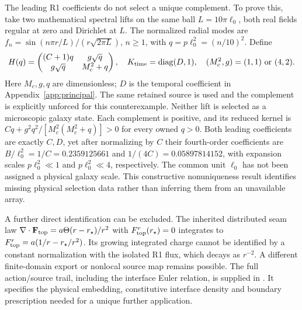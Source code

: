The leading R1 coefficients do not select a unique complement. To prove
this, take two mathematical spectral lifts on the same ball
$L=10\pi\ell_0$, both real fields regular at zero and Dirichlet at $L$.
The normalized radial modes are
$f_n=\sin(n\pi r/L)/(r\sqrt{2\pi L})$, $n\ge1$,
with $q=p\ell_0^2=(n/10)^2$. Define
\begin{equation}
 H(q)=\begin{pmatrix}(C+1)q&g\sqrt q\\g\sqrt q&M_c^2+q\end{pmatrix},
 \quad K_{\rm time}=\operatorname{diag}(D,1),
 \quad (M_c^2,g)=(1,1)\ \hbox{or}\ (4,2).
 \label{eq:complement-witness}
\end{equation}
Here $M_c,g,q$ are dimensionless; $D$ is the temporal coefficient in
Appendix~\ref{app:principal}. The same retained source is used and the
complement is explicitly unforced for this counterexample. Neither lift
is selected as a microscopic galaxy state. Each complement is positive,
and its reduced kernel is
$Cq+g^2q^2/[M_c^2(M_c^2+q)]>0$ for every owned $q>0$.
Both leading coefficients are exactly $C,D$, yet after normalizing by
$C$ their fourth-order coefficients are
$B/\ell_0^2=1/C=0.2359125661$ and
$1/(4C)=0.05897814152$, with expansion scales
$p\ell_0^2\ll1$ and $p\ell_0^2\ll4$, respectively.
The common unit $\ell_0$ has not been assigned a physical galaxy scale.
This constructive nonuniqueness result identifies missing physical
selection data rather than inferring them from an unavailable array.

A further direct identification can be excluded. The inherited
distributed seam law
$\nabla\cdot\mathbf F_{\rm top}=a\Theta(r-r_\star)/r^2$ with
$F^r_{\rm top}(r_\star)=0$ integrates to
$F^r_{\rm top}=a(1/r-r_\star/r^2)$. Its growing integrated charge
cannot be identified by a constant normalization with the isolated R1
flux, which decays as $r^{-2}$. A different finite-domain export or
nonlocal source map remains possible. The full action/source trail,
including the interface Euler relation, is supplied in
.
It specifies the physical embedding, constitutive interface density and
boundary prescription needed for a unique further application.
